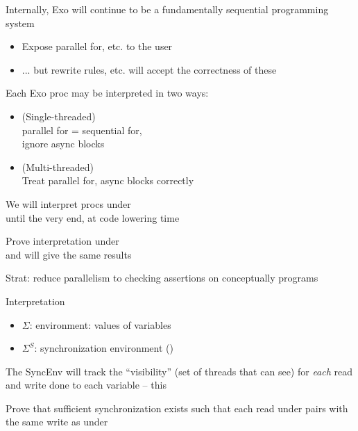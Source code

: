 \begin{minipage}[t]{0.48\textwidth}\fixminipage
Internally, Exo will continue to be a fundamentally sequential programming system
\begin{itemize}
  \item Expose parallel for, etc. to the user
  \item ... but rewrite rules, etc. will accept the correctness of these 
\end{itemize}
Each Exo proc may be interpreted in two ways:
\begin{itemize}
  \item {} (Single-threaded)\\parallel for = sequential for,\\ignore async blocks
  \item {} (Multi-threaded)\\Treat parallel for, async blocks correctly
\end{itemize}
We will interpret procs under \\until the very end, at code lowering time

Prove interpretation under \\and {} will give the same results

\end{minipage}
\hfill
\begin{minipage}[t]{0.48\textwidth}\fixminipage
Strat: reduce parallelism to checking assertions on conceptually  programs

Interpretation
\begin{itemize}
  \item $\Sigma$: environment: values of variables
  \item $\Sigma^S$: synchronization environment ()
\end{itemize}
\vspace{8mm}
The SyncEnv will track the ``visibility'' (set of threads that can see) for \textit{each} read and write done to each variable -- this 

Prove that sufficient synchronization exists such that each read under  pairs with the same write as under 
\end{minipage}
\vfill
